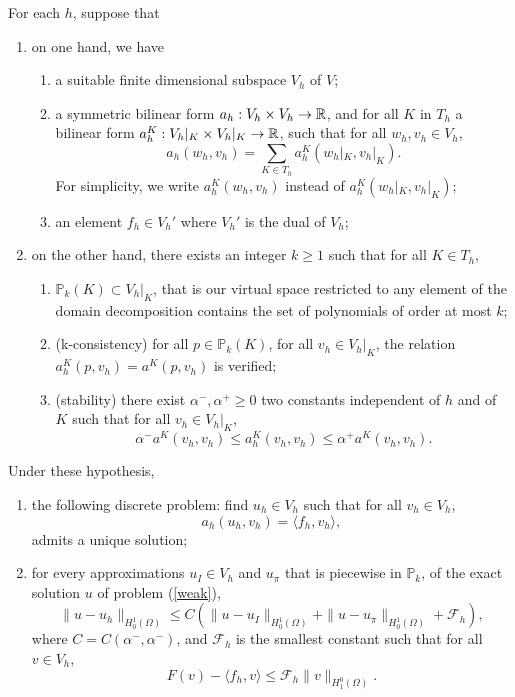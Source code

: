 \begin{theorem} \label{conditions}
For each $h$, suppose that
\begin{enumerate}
\item on one hand, we have \begin{enumerate}
\item a suitable finite dimensional subspace $V_h$ of $V$;
\item a symmetric bilinear form $a_h : V_h\times V_h \rightarrow \mathbb{R}$, and for all $K$ in $T_h$ a bilinear form $a_h^K:V_h|_K \times V_h|_K \rightarrow \mathbb{R}$, such that for all $w_h,v_h\in V_h$, 
$$ a_h(w_h, v_h) = \sum_{K\in T_h} a_h^K(w_h|_K,v_h|_K).$$ For simplicity, we write $a_h^K(w_h,v_h)$ instead of $a_h^K(w_h|_K,v_h|_K)$;
\item an element $f_h \in V_h'$ where $V_h'$ is the dual of $V_h$;
\end{enumerate}
\item on the other hand, there exists an integer $k\geq 1$ such that for all $K \in T_h$,
\begin{enumerate}
\item $\mathbb{P}_k(K) \subset V_h|_K$, that is our virtual space restricted to any element of the domain decomposition contains the set of polynomials of order at most $k$;
\item(k-consistency) for all $p\in \mathbb{P}_k(K)$, for all $v_h\in V_h|_K$, the relation $a_h^K(p, v_h) = a^K(p, v_h)$ is verified;
\item (stability) there exist $\alpha^-, \alpha^+ \geq 0$ two constants independent of $h$ and of $K$ such that for all $v_h\in V_h|_K$,
$$ \alpha^-a^K(v_h,v_h)\leq a_h^K(v_h,v_h)\leq \alpha^+a^K(v_h,v_h).$$
\end{enumerate}
\end{enumerate}
Under these hypothesis, 
\begin{enumerate}
\item the following discrete problem: find $u_h\in V_h$ such that for all $v_h \in V_h$, \begin{equation}\label{discretepb}
a_h(u_h,v_h) = \langle f_h,v_h\rangle,
\end{equation} admits a unique solution;
\item for every approximations $u_I\in V_h$ and $u_\pi$ that is piecewise in $\mathbb{P}_k$, of the exact solution $u$ of problem (\ref{weak}), $$\|u-u_h\|_{H_0^1(\Omega)} \leq C\left(\|u-u_I\|_{H_0^1(\Omega)} + \|u-u_\pi\|_{H_0^1(\Omega)} + \mathcal{F}_h\right),$$
where $C=C(\alpha^-,\alpha^-)$, and $\mathcal{F}_h$ is the smallest constant such that for all $v\in V_h$, 
\begin{equation}\label{calFh}
F(v)-\langle f_h,v\rangle \leq \mathcal{F}_h\|v\|_{H^0_1(\Omega)}.
\end{equation}
\end{enumerate}
\end{theorem}
